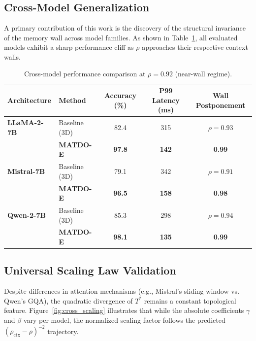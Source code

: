 \documentclass[11pt,a4paper]{article}
\theoremstyle{plain}
\theoremstyle{definition}
\begin{document}
\subsection{Cross-Model Generalization}
A primary contribution of this work is the discovery of the structural invariance of the memory wall across model families. As shown in Table~\ref{tab:cross_model}, all evaluated models exhibit a sharp performance cliff as $\rho$ approaches their respective context walls.

\begin{table}[t]
\centering
\caption{Cross-model performance comparison at $\rho=0.92$ (near-wall regime).}
\label{tab:cross_model}
\begin{tabular}{@{}llccc@{}}
\toprule
Architecture & Method & Accuracy (\%) & P99 Latency (ms) & Wall Postponement \\
\midrule
\textbf{LLaMA-2-7B} & Baseline (3D) & 82.4 & 315 & $\rho=0.93$ \\
                    & \textbf{MATDO-E} & \textbf{97.8} & \textbf{142} & \textbf{0.99} \\
\midrule
\textbf{Mistral-7B} & Baseline (3D) & 79.1 & 342 & $\rho=0.91$ \\
                    & \textbf{MATDO-E} & \textbf{96.5} & \textbf{158} & \textbf{0.98} \\
\midrule
\textbf{Qwen-2-7B}  & Baseline (3D) & 85.3 & 298 & $\rho=0.94$ \\
                    & \textbf{MATDO-E} & \textbf{98.1} & \textbf{135} & \textbf{0.99} \\
\bottomrule
\end{tabular}
\end{table}

\subsection{Universal Scaling Law Validation}
Despite differences in attention mechanisms (e.g., Mistral's sliding window vs. Qwen's GQA), the quadratic divergence of $T^*$ remains a constant topological feature. Figure~\ref{fig:cross_scaling} illustrates that while the absolute coefficients $\gamma$ and $\beta$ vary per model, the normalized scaling factor follows the predicted $(\rho_{\text{ctx}}-\rho)^{-2}$ trajectory.
\end{document}
